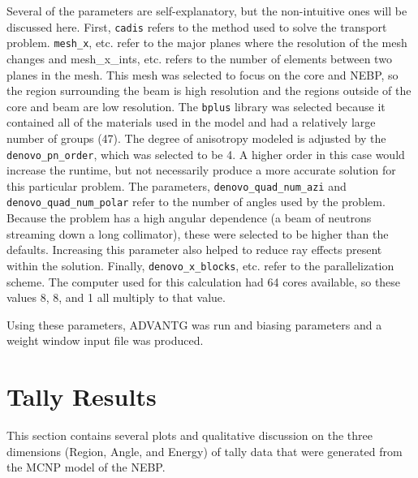 Several of the parameters are self-explanatory, but the non-intuitive ones will be discussed here.
First, {\tt cadis} refers to the method used to solve the transport problem.
{\tt mesh\_x}, etc. refer to the major planes where the resolution of the mesh changes and {mesh\_x\_ints}, etc. refers to the number of elements between two planes in the mesh.
This mesh was selected to focus on the core and NEBP, so the region surrounding the beam is high resolution and the regions outside of the core and beam are low resolution.
The {\tt bplus} library was selected because it contained all of the materials used in the model and had a relatively large number of groups (47).
The degree of anisotropy modeled is adjusted by the {\tt denovo\_pn\_order}, which was selected to be 4.
A higher order in this case would increase the runtime, but not necessarily produce a more accurate solution for this particular problem.
The parameters, {\tt denovo\_quad\_num\_azi} and {\tt denovo\_quad\_num\_polar} refer to the number of angles used by the problem.
Because the problem has a high angular dependence (a beam of neutrons streaming down a long collimator), these were selected to be higher than the defaults.
Increasing this parameter also helped to reduce ray effects present within the solution.
Finally, {\tt denovo\_x\_blocks}, etc. refer to the parallelization scheme.
The computer used for this calculation had 64 cores available, so these values 8, 8, and 1 all multiply to that value.

Using these parameters, ADVANTG was run and biasing parameters and a weight window input file was produced.



\section{Tally Results}

This section contains several plots and qualitative discussion on the three dimensions (Region, Angle, and Energy) of tally data that were generated from the MCNP model of the NEBP.


